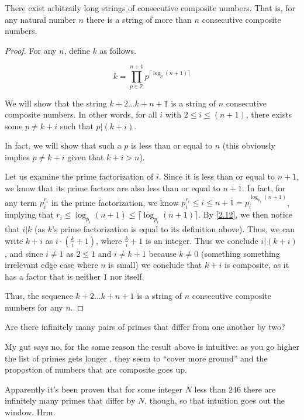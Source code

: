 \documentclass[../main.tex]{subfiles}
\begin{document}
\begin{thm} \label{2.46}
  There exist arbitraily long strings of consecutive composite numbers. That is, for any natural number $n$ there is a string of more than $n$ consecutive composite numbers.
\end{thm}

\begin{proof}
  For any $n$, define $k$ as follows.

  $$k = \prod_{p \in \mathbb{P}}^{n+1} p^{\lceil \log_{p}(n+1) \rceil}$$

  We will show that the string $k+2 \ldots k+n+1$ is a string of $n$ consecutive composite numbers. In other words, for all $i$ with $2 \leq i \leq (n+1)$, there exists some $p \neq k+i$ such that $p | (k+i)$.

  In fact, we will show that such a $p$ is less than or equal to $n$ (this obviously implies $p \neq k+i$ given that $k+i > n$).

  Let us examine the prime factorization of $i$. Since it is less than or equal to $n+1$, we know that its prime factors are also less than or equal to $n+1$. In fact, for any term $p_i ^ {r_i}$ in the prime factorization, we know $p_i ^ {r_i} \leq i \leq n+1 = p_i ^ {\log_{p_i}(n+1)}$, implying that $r_i \leq \log_{p_i}(n+1) \leq \lceil \log_{p_i}(n+1) \rceil$.
  By \ref{2.12}, we then notice that $i | k$ (as $k$'s prime factorization is equal to its definition above).
  Thus, we can write $k+i$ as $i \cdot (\frac{k}{i} + 1)$, where $\frac{k}{i} + 1$ is an integer. Thus we conclude $i | (k + i)$, and since $i \neq 1$ as $2 \leq 1$ and $i \neq k+1$ because $k \neq 0$ (something something irrelevant edge case where $n$ is small) we conclude that $k+i$ is composite, as it has a factor that is neither $1$ nor itself.

  Thus, the sequence $k+2 \ldots k+n+1$ is a string of $n$ consecutive composite numbers for any $n$.
\end{proof}


\begin{ques} \label{2.47}
  Are there infinitely many pairs of primes that differ from one another by two?
\end{ques}

My gut says no, for the same reason the result above is intuitive: as you go higher  the list of primes gets longer , they seem to ``cover more ground'' and the propostion of numbers that are composite goes up.

Apparently it's been proven that for some integer $N$ less than $246$ there are infinitely many primes that differ by $N$, though, so that intuition goes out the window. Hrm.
\end{document}
